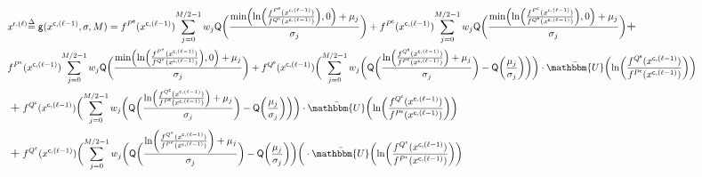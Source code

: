 \documentclass[journal]{IEEEtran}
\newcommand{\mep}{{x}}
\newcommand{\row}{\mathsf{r}}
\newcommand{\col}{\mathsf{c}}
\newcommand{\Q}{\mathsf{Q}}
\newcommand{\Pue}{P^{\mathsf{e}}}
\newcommand{\Que}{Q^{\mathsf{e}}}
\newcommand{\Puc}{P^{\mathsf{c}}}
\newcommand{\Quc}{Q^{\mathsf{c}}}
\newcommand{\Puep}{P^{\mathsf{\epsilon}}}
\newcommand{\Quep}{Q^{\mathsf{\epsilon}}}
\let\originalleft\left
\let\originalright\right
\renewcommand{\left}{\mathopen{}\mathclose\bgroup\originalleft}
\renewcommand{\right}{\aftergroup\egroup\originalright}
\newcommand\scalemath[2]{\scalebox{#1}{\mbox{\ensuremath{\displaystyle #2}}}}   %
\begin{document}
\begin{figure*}[t]
	\vspace*{-20pt}
	\hrulefill		
	\begin{align}\label{QAMxrl}
	& \scalemath{0.78}{\nonumber \mep^{\row,(\ell)}}  \scalemath{0.8}{ \buildrel \Delta \over = \mathsf{g}(\mep^{\col,(\ell-1)}, \sigma, M) = f^{\Pue}(\mep^{\col,(\ell-1)}){\sum\limits_{j = 0}^{M/2 - 1} {w_j} {\Q\biggl( \frac{{ \text{min}\left(\ln \left( \frac{f^{\Pue}(\mep^{\col,(\ell-1)})}{f^{\Quc}(\mep^{\col,(\ell-1)})}\right),0\right)+\mu_{j}}}{\sigma_{j}} \biggr) } } + f^{\Puc}(\mep^{\col,(\ell-1)}){\sum\limits_{j = 0}^{M/2 - 1} {w_j} {\Q\biggl( \frac{{ \text{min}\left(\ln \left( \frac{f^{\Puc}(\mep^{\col,(\ell-1)})}{f^{\Que}(\mep^{\col,(\ell-1)})}\right),0\right)+\mu_{j}}}{\sigma_{j}} \biggr) } }} + \\ \nonumber &  \scalemath{0.78}{f^{\Puep}(\mep^{\col,(\ell-1)}){\sum\limits_{j = 0}^{M/2 - 1} {w_j} {\Q\biggl( \frac{{ \text{min}\left(\ln \left( \frac{f^{\Puep}(\mep^{\col,(\ell-1)})}{f^{\Quep}(\mep^{\col,(\ell-1)})}\right),0\right)+\mu_{j}}}{\sigma_{j}} \biggr) } } + f^{\Que}(\mep^{\col,(\ell-1)})\biggl( {\sum\limits_{j = 0}^{M/2 - 1} {w_j} \biggl( {\Q\biggl( \frac{{ \ln \left( \frac{f^{\Que}(\mep^{\col,(\ell-1)})}{f^{\Puc}(\mep^{\col,(\ell-1)})}\right)+\mu_{j}}}{\sigma_{j}} \biggr) } - \Q\biggl(\frac{\mu_{j}}{\sigma_{j}} \biggr) \biggr) } \biggr) \cdot \bar{\mathbbm{U}} \biggl( \ln \left(\frac{f^{\Que}(\mep^{\col,(\ell-1)})}{f^{\Puc}(\mep^{\col,(\ell-1)})}\right) \biggr)} \\ \nonumber & + \scalemath{0.78}{f^{\Quc}(\mep^{\col,(\ell-1)})\biggl( {\sum\limits_{j = 0}^{M/2 - 1} {w_j}  \biggl( {\Q\biggl( \frac{{ \ln \left( \frac{f^{\Quc}(\mep^{\col,(\ell-1)})}{f^{\Pue}(\mep^{\col,(\ell-1)})}\right)+\mu_{j}}}{\sigma_{j}} \biggr) } - \Q\left(\frac{\mu_{j}}{\sigma_{j}} \right) \biggr) } \biggr) \cdot \bar{\mathbbm{U}} \left( \ln \left(\frac{f^{\Quc}(\mep^{\col,(\ell-1)})}{f^{\Pue}(\mep^{\col,(\ell-1)})}\right) \right)} \\  & + \scalemath{0.78}{f^{\Quep}(\mep^{\col,(\ell-1)})\biggl( {\sum\limits_{j = 0}^{M/2 - 1} {w_j}  \biggl({\Q\biggl( \frac{{ \ln \biggl( \frac{f^{\Quep}(\mep^{\col,(\ell-1)})}{f^{\Puep}(\mep^{\col,(\ell-1)})}\biggr)+\mu_{j}}}{\sigma_{j}} \biggr) } - \Q\biggl(\frac{\mu_{j}}{\sigma_{j}}\biggr) \biggr) } \biggr( \cdot \bar{\mathbbm{U}} \biggl( \ln \left(\frac{f^{\Quep}(\mep^{\col,(\ell-1)})}{f^{\Puep}(\mep^{\col,(\ell-1)})}\right) \biggr)}
	\end{align}
	\hrulefill
\end{figure*} 
\end{document}
